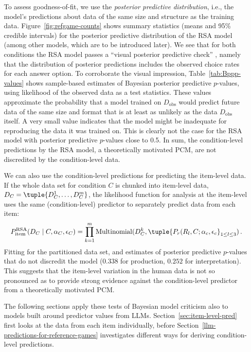 \documentclass[fleqn]{article}
\begin{document}
To assess goodness-of-fit, we use the \emph{posterior predictive distribution}, i.e., the model's predictions about data of the same size and structure as the training data.
Figure~\ref{fig:refgame-counts} shows summary statistics (means and 95\% credible intervals) for the posterior predictive distribution of the RSA model (among other models, which are to be introduced later).
We see that for both conditions the RSA model passes a ``visual posterior predictive check'' \citep{Kruschke2011:Doing-Bayesian-}, namely that the distribution of posterior predictions includes the observed choice rates for each answer option.
To corroborate the visual impression, Table~\ref{tab:Bppp-values} shows sample-based estimates of Bayesian posterior predictive $p$-values, using likelihood of the observed data as a test statistics.
These values approximate the probability that a model trained on $D_{\text{obs}}$ would predict future data of the same size and format that is at least as unlikely as the data $D_{\text{obs}}$ itself.
A very small value indicates that the model might be inadequate for reproducing the data it was trained on.
This is clearly not the case for the RSA model with posterior predictive $p$-values close to 0.5.
In sum, the condition-level predictions by the RSA model, a theoretically motivated PCM, are not discredited by the condition-level data.

We can also use the condition-level predictions for predicting the item-level data.
If the whole data set for condition $C$ is chunked into item-level data, $D_{C} = \tuple{D^{1}_{C}, \dots, D^{m}_{C} }$, the likelihood function for analysis at the item-level uses the same (condition-level) predictor to separately predict data from each item:
%
\begin{align*}
 P^{\text{RSA}}_{\text{item}}(D_{C} \mid C, \alpha_{C}, \epsilon_{C}) = \prod_{k = 1}^{m} \text{Multinomial}(D_{C}^{k}, \tuple{P_{r}(R_{l}, C; \alpha_{c}, \epsilon_{c}}_{1 \le l \le 3})\,.
\end{align*}
%
Fitting for the partitioned data set, and estimates of posterior predictive $p$-values that do not discredit the model ($0.338$ for production, $0.252$ for interpretation).
This suggests that the item-level variation in the human data is not so pronounced as to provide strong evidence against the condition-level predictor from a theoretically motivated PCM.

The following sections apply these tests of Bayesian model criticism also to models built around predictor values from LLMs.
Section~\ref{sec:item-level-pred} first looks at the data from each item individually, before Section~\ref{llm-predictions-for-reference-games} investigates different ways for deriving condition-level predictions.
\end{document}
